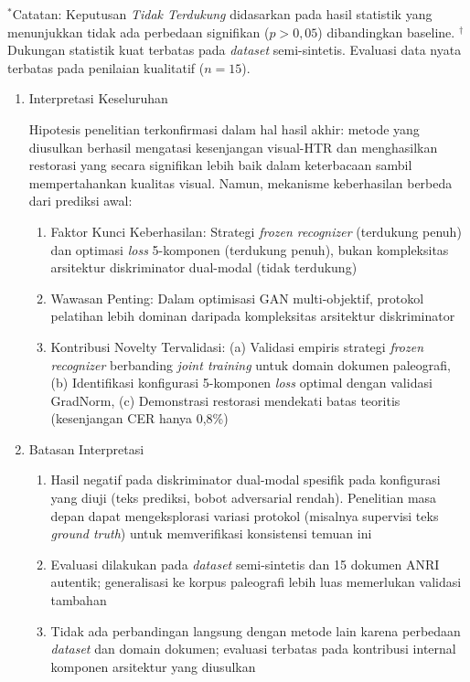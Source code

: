 \small $^*$Catatan: Keputusan \textit{Tidak Terdukung} didasarkan pada hasil statistik yang menunjukkan tidak ada perbedaan signifikan ($p>0,05$) dibandingkan baseline.
\newline
$^{\dagger}$Dukungan statistik kuat terbatas pada \textit{dataset} semi-sintetis. Evaluasi data nyata terbatas pada penilaian kualitatif ($n=15$).
\normalsize

\begin{enumerate}[leftmargin=1.5em, labelsep=0.5em, itemindent=0pt, label=\arabic*., topsep=0pt, partopsep=0pt]
    \item Interpretasi Keseluruhan
    
    Hipotesis penelitian terkonfirmasi dalam hal hasil akhir: metode yang diusulkan berhasil mengatasi kesenjangan visual-HTR dan menghasilkan restorasi yang secara signifikan lebih baik dalam keterbacaan sambil mempertahankan kualitas visual. Namun, mekanisme keberhasilan berbeda dari prediksi awal:

    \begin{enumerate}[leftmargin=1.5em, labelsep=0.5em, itemindent=0pt, noitemsep, topsep=0pt, label=\alph*)]
        \item Faktor Kunci Keberhasilan: Strategi \textit{frozen recognizer} (terdukung penuh) dan optimasi \textit{loss} 5-komponen (terdukung penuh), bukan kompleksitas arsitektur diskriminator dual-modal (tidak terdukung)
        \item Wawasan Penting: Dalam optimisasi GAN multi-objektif, protokol pelatihan lebih dominan daripada kompleksitas arsitektur diskriminator
        \item Kontribusi Novelty Tervalidasi: (a) Validasi empiris strategi \textit{frozen recognizer} berbanding \textit{joint training} untuk domain dokumen paleografi, (b) Identifikasi konfigurasi 5-komponen \textit{loss} optimal dengan validasi GradNorm, (c) Demonstrasi restorasi mendekati batas teoritis (kesenjangan CER hanya 0,8\%)
    \end{enumerate}

    \item Batasan Interpretasi
    
    \begin{enumerate}[leftmargin=1.5em, labelsep=0.5em, itemindent=0pt, noitemsep, topsep=0pt, label=\alph*)]
        \item Hasil negatif pada diskriminator dual-modal spesifik pada konfigurasi yang diuji (teks prediksi, bobot adversarial rendah). Penelitian masa depan dapat mengeksplorasi variasi protokol (misalnya supervisi teks \textit{ground truth}) untuk memverifikasi konsistensi temuan ini
        \item Evaluasi dilakukan pada \textit{dataset} semi-sintetis dan 15 dokumen ANRI autentik; generalisasi ke korpus paleografi lebih luas memerlukan validasi tambahan
        \item Tidak ada perbandingan langsung dengan metode lain karena perbedaan \textit{dataset} dan domain dokumen; evaluasi terbatas pada kontribusi internal komponen arsitektur yang diusulkan
    \end{enumerate}


\end{enumerate}
